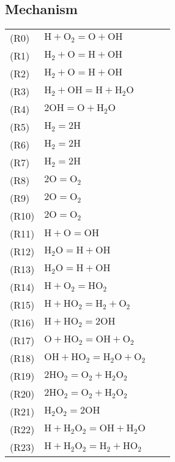 \documentclass[preprint,3p,times,twocolumn]{elsarticle}
\begin{document}
\subsection{Mechanism}
\begin{table}[htp]
  \centering
  \begin{tabular}{l l l l}
\hline
(R0)&$ \mathrm{H} + \mathrm{O}_2 = \mathrm{O} + \mathrm{OH}$\\
(R1)&$ \mathrm{H}_2 + \mathrm{O} = \mathrm{H} + \mathrm{OH}$\\
(R2)&$ \mathrm{H}_2 + \mathrm{O} = \mathrm{H} + \mathrm{OH}$\\
(R3)&$ \mathrm{H}_2 + \mathrm{OH} = \mathrm{H} + \mathrm{H}_2\mathrm{O}$\\
(R4)&$ 2\mathrm{OH} = \mathrm{O} + \mathrm{H}_2\mathrm{O}$\\
(R5)&$ \mathrm{H}_2 = 2\mathrm{H}$\\
(R6)&$ \mathrm{H}_2 = 2\mathrm{H}$\\
(R7)&$ \mathrm{H}_2 = 2\mathrm{H}$\\
(R8)&$ 2\mathrm{O} = \mathrm{O}_2$\\
(R9)&$ 2\mathrm{O} = \mathrm{O}_2$\\
(R10)&$ 2\mathrm{O} = \mathrm{O}_2$\\
(R11)&$ \mathrm{H} + \mathrm{O} = \mathrm{OH}$\\
(R12)&$ \mathrm{H}_2\mathrm{O} = \mathrm{H} + \mathrm{OH}$\\
(R13)&$ \mathrm{H}_2\mathrm{O} = \mathrm{H} + \mathrm{OH}$\\
(R14)&$ \mathrm{H} + \mathrm{O}_2 = \mathrm{HO}_2$\\
(R15)&$ \mathrm{H} + \mathrm{HO}_2 = \mathrm{H}_2 + \mathrm{O}_2$\\
(R16)&$ \mathrm{H} + \mathrm{HO}_2 = 2\mathrm{OH}$\\
(R17)&$ \mathrm{O} + \mathrm{HO}_2 = \mathrm{OH} + \mathrm{O}_2$\\
(R18)&$ \mathrm{OH} + \mathrm{HO}_2 = \mathrm{H}_2\mathrm{O} + \mathrm{O}_2$\\
(R19)&$ 2\mathrm{HO}_2 = \mathrm{O}_2 + \mathrm{H}_2\mathrm{O}_2$\\
(R20)&$ 2\mathrm{HO}_2 = \mathrm{O}_2 + \mathrm{H}_2\mathrm{O}_2$\\
(R21)&$ \mathrm{H}_2\mathrm{O}_2 = 2\mathrm{OH}$\\
(R22)&$ \mathrm{H} + \mathrm{H}_2\mathrm{O}_2 = \mathrm{OH} + \mathrm{H}_2\mathrm{O}$\\
(R23)&$ \mathrm{H} + \mathrm{H}_2\mathrm{O}_2 = \mathrm{H}_2 + \mathrm{HO}_2$\\

\end{tabular}
\end{table}
\end{document}
